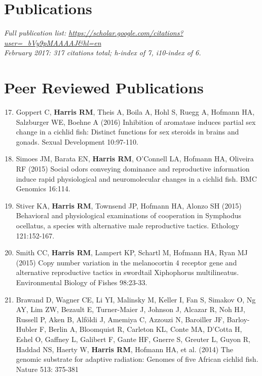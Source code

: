 \documentclass[margin,line]{resume}
\newenvironment{benumerate}[1]{
    \let\oldItem\item
    \def\item{\addtocounter{enumi}{-2}\oldItem}
    \begin{enumerate}
    \setcounter{enumi}{#1}
    \addtocounter{enumi}{1}
}{
    \end{enumerate}
}
\begin{document}
\begin{resume}

    \section{\mysidestyle Publications}

{\em Full publication list: \url{https://scholar.google.com/citations?user=_bVy9pMAAAAJ&hl=en}
\\
  February 2017: 317 citations total; h-index of 7, i10-index of 6.}
 

    \section{\mysidestyle Peer Reviewed Publications}
    
\begin{benumerate}{16}
\setlength{\itemsep}{3pt}
\item Goppert C, {\bf Harris RM}, Theis A, Boila A, Hohl S, Ruegg A, Hofmann HA, Salzburger WE, Boehne A (2016)  Inhibition of aromatase induces partial sex change in a cichlid fish: Distinct functions for sex steroids in brains and gonads. Sexual Development 10:97-110.

\item Simoes JM, Barata EN, {\bf Harris RM}, O'Connell LA, Hofmann HA, Oliveira RF (2015) Social odors conveying dominance and reproductive information induce rapid physiological and neuromolecular changes in a cichlid fish. BMC Genomics 16:114. 

\item Stiver KA, {\bf Harris RM}, Townsend JP, Hofmann HA, Alonzo SH (2015) Behavioral and physiological examinations of cooperation in Symphodus ocellatus, a species with alternative male reproductive tactics. Ethology 121:152-167.

\item Smith CC, {\bf Harris RM}, Lampert KP, Schartl M, Hofmann HA, Ryan MJ (2015) Copy number variation in the melanocortin 4 receptor gene and alternative reproductive tactics in swordtail Xiphophorus multilineatus. Environmental Biology of Fishes 98:23-33.

\item Brawand D, Wagner CE, Li YI, Malinsky M, Keller I, Fan S, Simakov O, Ng AY, Lim ZW, Bezault E, Turner-Maier J, Johnson J, Alcazar R, Noh HJ, Russell P, Aken B, Alföldi J, Amemiya C, Azzouzi N, Baroiller JF, Barloy-Hubler F, Berlin A, Bloomquist R, Carleton KL, Conte MA, D'Cotta H, Eshel O, Gaffney L, Galibert F, Gante HF, Gnerre S, Greuter L, Guyon R, Haddad NS, Haerty W, {\bf Harris RM}, Hofmann HA, et al. (2014) The genomic substrate for adaptive radiation: Genomes of five African cichlid fish. Nature 513: 375-381


\end{benumerate}
\end{resume}
\end{document}
